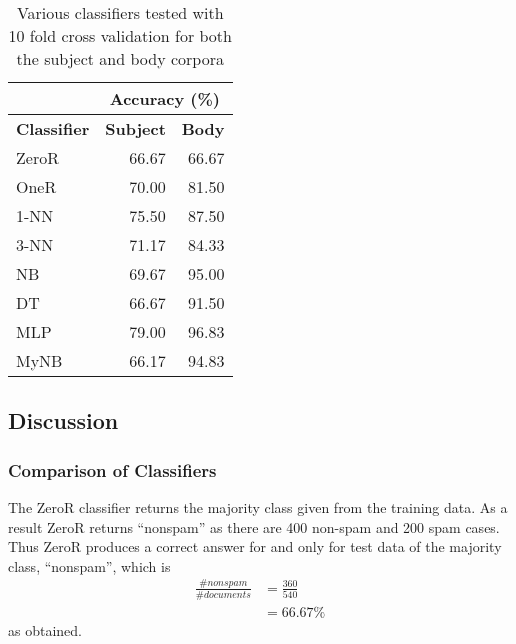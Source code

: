 \documentclass[10pt, a4paper]{article}
\begin{document}
\begin{table}[H]
\centering
\caption{Various classifiers tested with 10 fold cross validation for both the subject and body corpora}
\begin{tabular}{@{}lrr@{}}
\toprule
& \multicolumn{2}{c}{\textbf{Accuracy (\%)}} \\
\midrule
\textbf{Classifier} & \textbf{Subject} & \textbf{Body} \\
\midrule
ZeroR & 66.67 & 66.67 \\
OneR & 70.00 & 81.50 \\
1-NN & 75.50 & 87.50 \\
3-NN & 71.17 & 84.33 \\
NB & 69.67 & 95.00 \\
DT & 66.67 & 91.50 \\
MLP & 79.00 & 96.83 \\
MyNB & 66.17 & 94.83 \\
\bottomrule
\end{tabular}
\label{table:results}
\end{table}

\subsection{Discussion}

%

\subsubsection{Comparison of Classifiers}

The ZeroR classifier returns the majority class given from the training data. As a result ZeroR returns ``nonspam'' as there are 400 non-spam and 200 spam cases. Thus ZeroR produces a correct answer for and only for test data of the majority class, ``nonspam'', which is 
\begin{align*}
	
\frac{\# nonspam}{\# documents} &=  \frac{360}{540} \\
&= 66.67\%

\end{align*}
as obtained.
\end{document}
